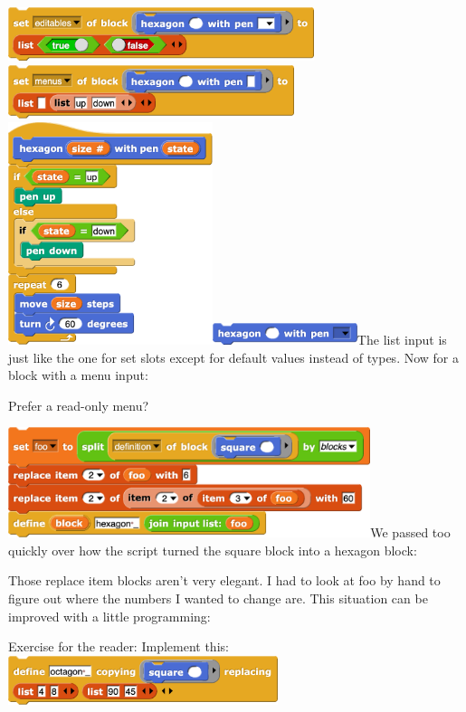 \includegraphics[width=3.51944in,height=0.61944in]{media/image956.png}\includegraphics[width=3.29097in,height=0.60972in]{media/image961.png}\includegraphics[width=2.35in,height=2.56in]{media/image962.png}\includegraphics[width=1.66944in,height=0.25in]{media/image963.png}The
list input is just like the one for set slots except for default values
instead of types. Now for a block with a menu input:

Prefer a read-only menu?

\includegraphics[width=4.16944in,height=1.26944in]{media/image964.png}We
passed too quickly over how the script turned the square block into a
hexagon block:

Those replace item blocks aren't very elegant. I had to look at foo by
hand to figure out where the numbers I wanted to change are. This
situation can be improved with a little programming:

Exercise for the reader: Implement
this:\includegraphics[width=3.11in,height=0.57in]{media/image971.png}

